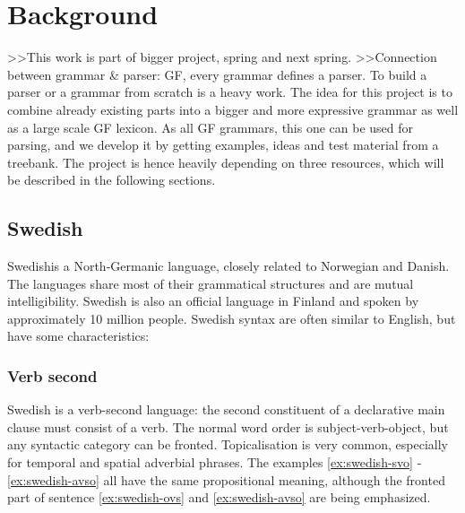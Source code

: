 \documentclass{report}
\begin{document}
\section{Background}  
>>This work is part of bigger project, spring and next spring.
>>Connection between grammar & parser: GF, every grammar defines a parser.
To build a parser or a grammar from scratch is a heavy work. The idea for this
project is to combine already existing parts into a bigger and more expressive grammar
as well as a large scale GF lexicon.
As all GF grammars, this one can be used for parsing, and we develop it by getting
examples, ideas and test material from a treebank.
The project is hence heavily depending on three resources, which will be described
in the following sections.

\subsection{Swedish}
Swedish\cite[Inl. ]{SAG}is a North-Germanic language,
closely related to Norwegian and Danish. The languages share most of their
grammatical structures and are mutual intelligibility. Swedish is also 
an official language in Finland and spoken by approximately 10 million people.
Swedish syntax are often similar to English, but have some characteristics:
\subsubsection*{Verb second}
Swedish is a verb-second language\cite[p. 116]{gunlog}: the
second constituent of a declarative main clause must consist of a verb.
The normal word order is subject-verb-object, but any syntactic category can be fronted\cite[]{H&H}.
Topicalisation is very common, especially for temporal and spatial adverbial phrases.
The examples \ref{ex:swedish-svo} - \ref{ex:swedish-avso} all have the same propositional
meaning, although the fronted part of sentence \ref{ex:swedish-ovs} and \ref{ex:swedish-avso} are being emphasized.
 \label{ex:swedish-svo}
\vspace{-3mm}
\label{ex:swedish-ovs} 
\vspace{-3mm}
 \label{ex:swedish-avso}
\end{document}
